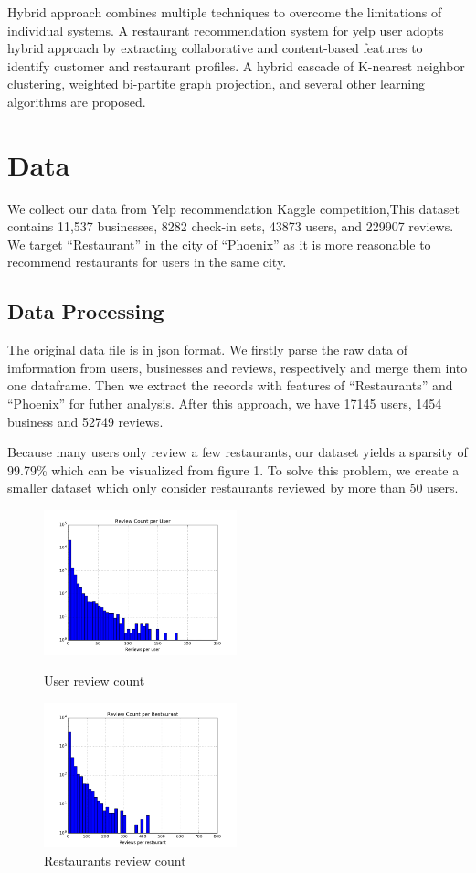 \documentclass{llncs}
\begin{document}
Hybrid approach combines multiple techniques to overcome the limitations of individual systems. A restaurant recommendation system for yelp user\cite{Sumedh} adopts hybrid approach by extracting collaborative and content-based features to identify customer and restaurant profiles. A hybrid cascade of K-nearest neighbor clustering, weighted bi-partite graph projection, and several other learning algorithms are proposed. 

\section{Data}
We collect our data from Yelp recommendation Kaggle competition\cite{yelp},This dataset contains 11,537 businesses, 8282 check-in sets, 43873 users, and 229907 reviews. We target “Restaurant” in the city of “Phoenix” as it is more reasonable to recommend restaurants for users in the same city.
\subsection{ Data Processing}
The original data file is in json format. We firstly parse the raw data of imformation from users, businesses and reviews, respectively and merge them into one dataframe. Then we extract the records with features of “Restaurants” and “Phoenix” for futher analysis. After this approach, we have 17145 users, 1454 business and 52749 reviews.

Because many users only review a few restaurants, our dataset yields a sparsity of 99.79\% which can be visualized from figure 1. To solve this problem, we create a smaller dataset which only consider  restaurants reviewed by more than 50 users.
%

\begin{figure}
	\begin{minipage}[t]{0.5\textwidth}
		\centering
		\includegraphics[width=2.2in]{fig1.png}
		\caption{User review count}
		\label{fig:side:a}
	\end{minipage}%
	\begin{minipage}[t]{0.5\textwidth}
		\centering
		\includegraphics[width=2.2in]{fig2.png}
		\caption{Restaurants review count}
		\label{fig:side:b}
	\end{minipage}
\end{figure}
\end{document}
